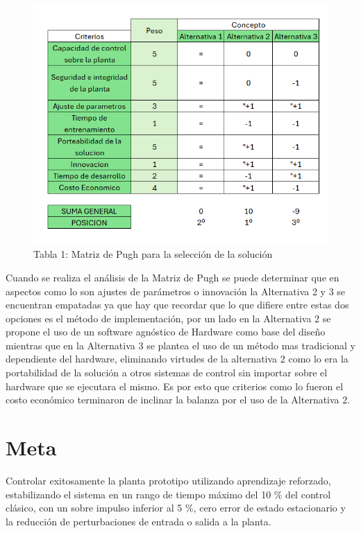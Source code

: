 \documentclass[12pt]{article}
\begin{document}
\begin{figure}[h]
  \centering
  \includegraphics[scale=0.7]{tablas/pugh.png}
  \captionsetup{labelformat=empty}  %
  \caption{Tabla 1: Matriz de Pugh para la selección de la solución}
\end{figure}

Cuando se realiza el análisis de la Matriz de Pugh se puede determinar que en aspectos como lo son ajustes de parámetros o innovación la Alternativa 2 y 3 se encuentran empatadas ya que hay que recordar que lo que difiere entre estas dos opciones es el método de implementación, por un lado en la Alternativa 2 se propone el uso de un software agnóstico de Hardware como base del diseño mientras que en la Alternativa 3 se plantea el uso de un método mas tradicional y dependiente del hardware, eliminando virtudes de la alternativa 2 como lo era la portabilidad de la solución a otros sistemas de control sin importar sobre el hardware que se ejecutara el mismo. Es por esto que criterios como lo fueron el costo económico terminaron de inclinar la balanza por el uso de la Alternativa 2. 

\section{Meta}

Controlar exitosamente la planta prototipo utilizando aprendizaje reforzado, estabilizando el sistema en un rango de tiempo máximo del 10 \% del control clásico, con un sobre impulso inferior al 5 \%, cero error de estado estacionario y la reducción de perturbaciones de entrada o salida a la planta.
\end{document}
